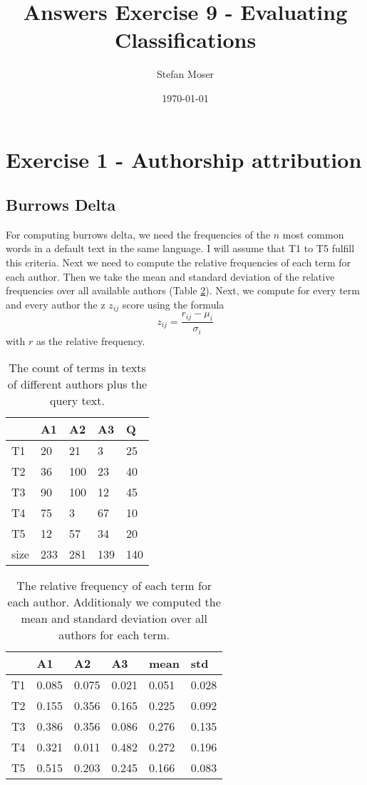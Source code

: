 \documentclass[11pt]{article}
\title{\textbf{Answers Exercise 9 - Evaluating Classifications}}
\author{Stefan Moser}
\date{\today}
\begin{document}
\maketitle

\section*{Exercise 1 - Authorship attribution}
\subsection{Burrows Delta}
For computing burrows delta, we need the 
frequencies of the $n$ most common words in a default text in the same language. I will
assume that T1 to T5 fulfill this criteria. Next we need to compute the relative frequencies of each term for each author.
Then we take the mean and standard deviation of the relative frequencies over
all available authors (Table \ref{table:rel_freq}).
Next, we compute for every term and every author the z $z_{ij}$ score using the formula
\begin{equation}
	z_{ij} = \frac{r_{ij} - \mu_i}{\sigma_i}
\end{equation}
with $r$ as the relative frequency. 
\begin{table}	
 \center
\begin{tabular}{|l|l|l|l|l|}
\hline
	 & A1 & A2 & A3 & Q\\
\hline
	T1 & 20 & 21 & 3 & 25\\
\hline
	T2 & 36 & 100 & 23 & 40\\
\hline
	T3 & 90 & 100 & 12 & 45\\
\hline
	T4 & 75 & 3 & 67 & 10\\
\hline
	T5 & 12 & 57 & 34 & 20\\
\hline
	size & 233 & 281 & 139 & 140\\
\hline
\end{tabular}
\caption{The count of terms in texts of different authors plus the query text.}
\label{table:count}
\end{table}
\begin{table}
\center
\begin{tabular}{|l|l|l|l|l|l|}
\hline
	 & A1 & A2 & A3 & mean & std\\
\hline
	T1 & 0.085 & 0.075 & 0.021 & 0.051 & 0.028\\
\hline
	T2 & 0.155 & 0.356 & 0.165 & 0.225 & 0.092\\
\hline
	T3 & 0.386 & 0.356 & 0.086 & 0.276 & 0.135\\
\hline
	T4 & 0.321 & 0.011 & 0.482 & 0.272 & 0.196\\
\hline
	T5 & 0.515 & 0.203 & 0.245 & 0.166 & 0.083\\
\hline
\end{tabular}
\caption{The relative frequency of each term
for each author. Additionaly we computed
the mean and standard deviation over all
authors for each term.}
\label{table:rel_freq}
\end{table}
\end{document}
